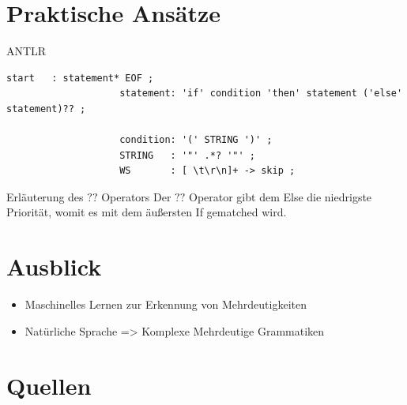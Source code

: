 \documentclass[t]{beamer}
\begin{document}
    \section{Praktische Ansätze}\label{sec:praktische-ansatze}
    \begin{frame}[fragile]
        \begin{block}{ANTLR}
            \begin{minipage}{\textwidth}
                \begin{lstlisting}[style=antlr,label={lst:lstlisting3}]
                    start   : statement* EOF ;
                    statement: 'if' condition 'then' statement ('else' statement)?? ;

                    condition: '(' STRING ')' ;
                    STRING   : '"' .*? '"' ;
                    WS       : [ \t\r\n]+ -> skip ;
                \end{lstlisting}
            \end{minipage}
        \end{block}
        \vspace{1em}
        \begin{exampleblock}{Erläuterung des \(??\) Operators}
            Der \(??\) Operator gibt dem Else die niedrigste Priorität, womit es mit dem äußersten If gematched wird. \\
        \end{exampleblock}\cite{parr}
    \end{frame}


    \section{Ausblick}\label{sec:ausblick-und-zukunftige-projekte}
    \begin{frame}
        \begin{itemize}
            \item Maschinelles Lernen zur Erkennung von Mehrdeutigkeiten
            \item Natürliche Sprache => Komplexe Mehrdeutige Grammatiken
        \end{itemize}
    \end{frame}


    \section{Quellen}\label{sec:quellen}
    \begin{frame}[allowframebreaks]
        
        
    \end{frame}
\end{document}
